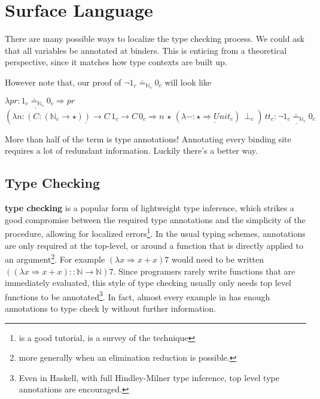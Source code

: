 \section{\Bidir{} Surface Language}
 
There are many possible ways to localize the type checking process.
We could ask that all variables be annotated at binders.
This is enticing from a theoretical perspective, since it matches how type contexts are built up.
 
However note that, our proof of $\lnot1_{c}\doteq_{\mathbb{N}_{c}}0_{c}$ will look like
 
$\lambda pr\underline{:1_{c}\doteq_{\mathbb{N}_{c}}0_{c}}\Rightarrow pr$
$\left(\lambda n:\underline{\left(C:\left(\mathbb{N}_{c}\rightarrow\star\right)\right)\rightarrow C\,1_{c}\rightarrow C\,0_{c}}\Rightarrow n\,\star\,(\lambda-:\underline{\star\Rightarrow Unit_{c}})\,\perp_{c}\right)\,tt_{c}:\underline{\lnot1_{c}\doteq_{\mathbb{N}_{c}}0_{c}}$
 
More than half of the term is type annotations!
Annotating every binding site requires a lot of redundant information.
Luckily there's a better way.
 
\subsection{\Bidir{} Type Checking}
 
\textbf{\Bidir{} type checking} is a popular form of lightweight type inference, which strikes a good compromise between the required type annotations and the simplicity of the procedure, allowing for localized errors\footnote{\cite{christiansen2013bidirectional} is a good tutorial, \cite{10.1145/3450952} is a survey of the technique}.
In the usual \bidir{} typing schemes, annotations are only required at the top-level, or around a function that is directly applied to an argument\footnote{more generally when an elimination reduction is possible.}.
For example $(\lambda x\Rightarrow x+x)7$ would need to be written $\left((\lambda x\Rightarrow x+x)::\mathbb{N}\rightarrow\mathbb{N}\right)7$.
Since programers rarely write functions that are immediately evaluated, this style of type checking usually only needs top level functions to be annotated\footnote{Even in Haskell, with full Hindley-Milner type inference, top level type annotations are encouraged.}.
In fact, almost every example in  has enough annotations to type check \bidir{}{}ly without further information.
 
